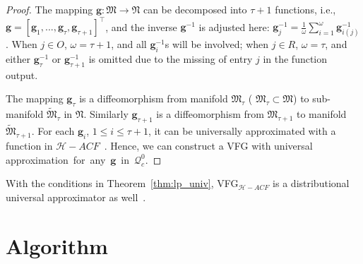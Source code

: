 \documentclass[sigconf, anonymous, review]{acmart}
\theoremstyle{plain}
\theoremstyle{definition}
\theoremstyle{remark}
\begin{document}
\begin{proof}
The mapping $\mathbf{g}:\mathfrak{M}  \rightarrow \mathfrak{N}$ can be decomposed into $\tau + 1$ functions, i.e.,  $\mathbf{g}=[\mathbf{g}_1, ..., \mathbf{g}_{\tau}, \mathbf{g}_{\tau+1}]^{\top}$, and the inverse $\mathbf{g}^{-1}$ is adjusted here:  $\mathbf{g}_j^{-1} = \frac{1}{\omega} \sum_{i=1}^{\omega} \mathbf{g}^{-1}_{i(j)}$. When $j\in O$, $\omega = \tau +1$, and all $\mathbf{g}^{-1}_i$s will be involved; when $j\in R$, $\omega = \tau$, and either $\mathbf{g}^{-1}_{\tau}$  or $\mathbf{g}^{-1}_{\tau +1}$ is omitted due to the missing of  entry $j$ in the function output. 

The mapping  $\mathbf{g}_{\tau}$  is a diffeomorphism from manifold  $\mathfrak{M}_{\tau}$ ( $\mathfrak{M}_{\tau} \subset \mathfrak{M}$) to  sub-manifold $\tilde{\mathfrak{M}}_{\tau}$  in $\mathfrak{N}$. Similarly 
$\mathbf{g}_{\tau+1}$ is a  diffeomorphism from  $\mathfrak{M}_{\tau+1}$  to  manifold $\tilde{\mathfrak{M}}_{\tau+1}$.  For each $\mathbf{g}_{i}$, $1\leq i \leq \tau +1$, it can be universally approximated with a function in $\mathcal{H}-ACF$~\cite{Takeshi2020}. Hence, we can construct a VFG with universal approximation~for~any~$\mathbf{g}$~in~$\mathcal{Q}_c^0$. 
\end{proof}
With the conditions in Theorem~\ref{thm:lp_univ},  VFG$_{\mathcal{H}-ACF}$ is a distributional universal approximator as well~\cite{Takeshi2020}.

\section{Algorithm}\label{sec:algrithm}
\end{document}
